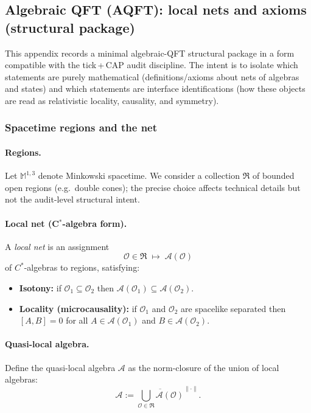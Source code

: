 \subsection{Algebraic QFT (AQFT): local nets and axioms (structural package)}
\label{app:aqft_axioms_local_nets}

This appendix records a minimal algebraic-QFT structural package in a form compatible with the tick\,+\,CAP audit discipline.
The intent is to isolate which statements are purely mathematical (definitions/axioms about nets of algebras and states) and which statements are interface identifications (how these objects are read as relativistic locality, causality, and symmetry).

\subsubsection{Spacetime regions and the net}
\paragraph{Regions.}
Let $\mathbb{M}^{1,3}$ denote Minkowski spacetime.
We consider a collection $\mathfrak{R}$ of bounded open regions (e.g.\ double cones); the precise choice affects technical details but not the audit-level structural intent.

\paragraph{Local net (C$^\ast$-algebra form).}
\begin{definition}
\label{def:z128_local_net}
A \emph{local net} is an assignment
\[
\mathcal{O}\in\mathfrak{R}\;\longmapsto\;\mathcal{A}(\mathcal{O})
\]
of $C^\ast$-algebras to regions, satisfying:
\begin{itemize}
\item \textbf{Isotony:} if $\mathcal{O}_1\subseteq \mathcal{O}_2$ then $\mathcal{A}(\mathcal{O}_1)\subseteq \mathcal{A}(\mathcal{O}_2)$.
\item \textbf{Locality (microcausality):} if $\mathcal{O}_1$ and $\mathcal{O}_2$ are spacelike separated then $[A,B]=0$ for all $A\in\mathcal{A}(\mathcal{O}_1)$ and $B\in\mathcal{A}(\mathcal{O}_2)$.
\end{itemize}
\end{definition}

\paragraph{Quasi-local algebra.}
Define the quasi-local algebra $\mathcal{A}$ as the norm-closure of the union of local algebras:
\[
\mathcal{A}:=\overline{\bigcup_{\mathcal{O}\in\mathfrak{R}}\mathcal{A}(\mathcal{O})}^{\|\cdot\|}.
\]

